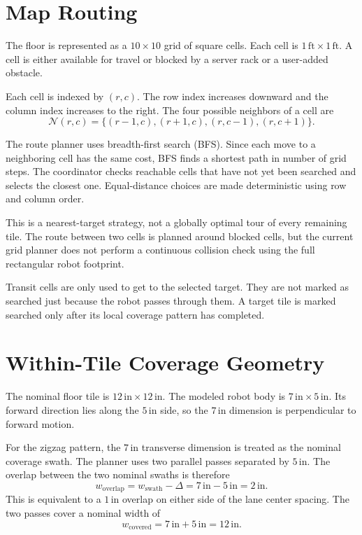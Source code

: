 \documentclass{article}
\begin{document}
\section{Map Routing}

The floor is represented as a $10\times10$ grid of square cells. Each cell is $1\,\mathrm{ft}\times1\,\mathrm{ft}$. A cell is either available for travel or blocked by a server rack or a user-added obstacle.

Each cell is indexed by $(r,c)$. The row index increases downward and the column index increases to the right. The four possible neighbors of a cell are
\[
\mathcal{N}(r,c)=
\{(r-1,c),(r+1,c),(r,c-1),(r,c+1)\}.
\]

The route planner uses breadth-first search (BFS). Since each move to a neighboring cell has the same cost, BFS finds a shortest path in number of grid steps. The coordinator checks reachable cells that have not yet been searched and selects the closest one. Equal-distance choices are made deterministic using row and column order.

This is a nearest-target strategy, not a globally optimal tour of every remaining tile. The route between two cells is planned around blocked cells, but the current grid planner does not perform a continuous collision check using the full rectangular robot footprint.

Transit cells are only used to get to the selected target. They are not marked as searched just because the robot passes through them. A target tile is marked searched only after its local coverage pattern has completed.

\section{Within-Tile Coverage Geometry}

The nominal floor tile is $12\,\mathrm{in}\times12\,\mathrm{in}$. The modeled robot body is $7\,\mathrm{in}\times5\,\mathrm{in}$. Its forward direction lies along the $5\,\mathrm{in}$ side, so the $7\,\mathrm{in}$ dimension is perpendicular to forward motion.

For the zigzag pattern, the $7\,\mathrm{in}$ transverse dimension is treated as the nominal coverage swath. The planner uses two parallel passes separated by $5\,\mathrm{in}$. The overlap between the two nominal swaths is therefore
\[
w_{\mathrm{overlap}}=w_{\mathrm{swath}}-\Delta
=7\,\mathrm{in}-5\,\mathrm{in}=2\,\mathrm{in}.
\]
This is equivalent to a $1\,\mathrm{in}$ overlap on either side of the lane center spacing. The two passes cover a nominal width of
\[
w_{\mathrm{covered}}=7\,\mathrm{in}+5\,\mathrm{in}=12\,\mathrm{in}.
\]
\end{document}
